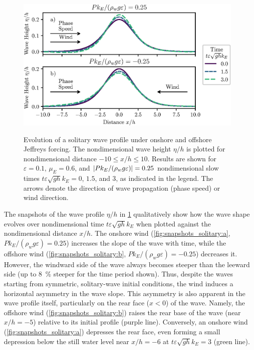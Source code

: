 \documentclass{jfm}
\renewcommand*{\epsilon}{\varepsilon}
\begin{document}
\begin{figure}
  \centering
  { %
    \label{fig:snapshots_solitary:a}
    \label{fig:snapshots_solitary:b}
  }
  \includegraphics{Snapshots-Positive-Negative-Production.eps}
  \caption{
    Evolution of a solitary wave profile under
    onshore and
    offshore Jeffreys forcing.
    The nondimensional wave height $\eta/h$ is plotted for
    nondimensional distance $-10 \le x/h \le 10$.
    Results are shown for $\epsilon=0.1$, $\mu_E = 0.6$, and $\abs{P
    k_E/(\rho_w g \epsilon)} = 0.25$ nondimensional slow times $t
    \epsilon \sqrt{gh} k_E = 0$, $1.5$, and $3$, as indicated in the
    legend.
    The arrows denote the direction of wave propagation (phase speed) or
    wind direction.
  }\label{fig:snapshots_solitary}
\end{figure}

The snapshots of the wave profile $\eta/h$ in
\cref{fig:snapshots_solitary} qualitatively show how the wave shape
evolves over nondimensional time $t \epsilon \sqrt{g h} k_E$ when
plotted against the nondimensional distance $x/h$.
The onshore wind (\cref{fig:snapshots_solitary:a}, $Pk_E/(\rho_w g
\epsilon) = 0.25$) increases the slope of the wave with time, while the
offshore wind (\cref{fig:snapshots_solitary:b}, $Pk_E/(\rho_w g
\epsilon) = -0.25$) decreases it.
However, the windward side of the wave always becomes steeper than the
leeward side (up to \SI{8}{\percent} steeper for the time period shown).
Thus, despite the waves starting from symmetric, solitary-wave initial
conditions, the wind induces a horizontal asymmetry in the wave slope.
This asymmetry is also apparent in the wave profile itself, particularly
on the rear face ($x<0$) of the wave.
Namely, the offshore wind (\cref{fig:snapshots_solitary:b}) raises the
rear base of the wave (near $x/h = -5$) relative to its initial profile
(purple line).
Conversely, an onshore wind (\cref{fig:snapshots_solitary:a}) depresses
the rear face, even forming a small depression below the still water
level near $x/h = -6$ at $t\epsilon \sqrt{gh} k_E=3$ (green line).
\end{document}
